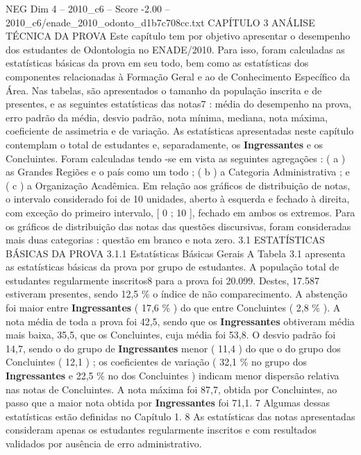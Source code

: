 \begin{textsample}{NEG Dim 4 – 2010\_c6 – Score -2.00 – 2010\_c6/enade\_2010\_odonto\_d1b7c708cc.txt}  \label{ex:f4_neg_047}
CAPÍTULO 3 ANÁLISE TÉCNICA DA PROVA Este capítulo tem por objetivo apresentar o desempenho dos estudantes de Odontologia no ENADE/2010.
Para isso, foram calculadas as estatísticas básicas da prova em seu todo, bem como as estatísticas dos componentes relacionadas à Formação Geral e ao de Conhecimento Específico da Área.
Nas tabelas, são apresentados o tamanho da população inscrita e de presentes, e as seguintes estatísticas das notas7 : média do desempenho na prova, erro padrão da média, desvio padrão, nota mínima, mediana, nota máxima, coeficiente de assimetria e de variação.
As estatísticas apresentadas neste capítulo contemplam o total de estudantes e, separadamente, os \textbf{Ingressantes} e os Concluintes.
Foram calculadas tendo -se em vista as seguintes agregações : ( a ) as Grandes Regiões e o país como um todo ; ( b ) a Categoria Administrativa ; e ( c ) a Organização Acadêmica.
Em relação aos gráficos de distribuição de notas, o intervalo considerado foi de 10 unidades, aberto à esquerda e fechado à direita, com exceção do primeiro intervalo, [ 0 ; 10 ], fechado em ambos os extremos.
Para os gráficos de distribuição das notas das questões discursivas, foram consideradas mais duas categorias : questão em branco e nota zero. 3.1 ESTATÍSTICAS BÁSICAS DA PROVA 3.1.1 Estatísticas Básicas Gerais A Tabela 3.1 apresenta as estatísticas básicas da prova por grupo de estudantes.
A população total de estudantes regularmente inscritos8 para a prova foi 20.099.
Destes, 17.587 estiveram presentes, sendo 12,5 \% o índice de não comparecimento.
A abstenção foi maior entre \textbf{Ingressantes} ( 17,6 \% ) do que entre Concluintes ( 2,8 \% ).
A nota média de toda a prova foi 42,5, sendo que os \textbf{Ingressantes} obtiveram média mais baixa, 35,5, que os Concluintes, cuja média foi 53,8.
O desvio padrão foi 14,7, sendo o do grupo de \textbf{Ingressantes} menor ( 11,4 ) do que o do grupo dos Concluintes ( 12,1 ) ; os coeficientes de variação ( 32,1 \% no grupo dos \textbf{Ingressantes} e 22,5 \% no dos Concluintes ) indicam menor dispersão relativa nas notas de Concluintes.
A nota máxima foi 87,7, obtida por Concluintes, ao passo que a maior nota obtida por \textbf{Ingressantes} foi 71,1. 7 Algumas dessas estatísticas estão definidas no Capítulo 1. 8 As estatísticas das notas apresentadas consideram apenas os estudantes regularmente inscritos e com resultados validados por ausência de erro administrativo.

\end{textsample}
